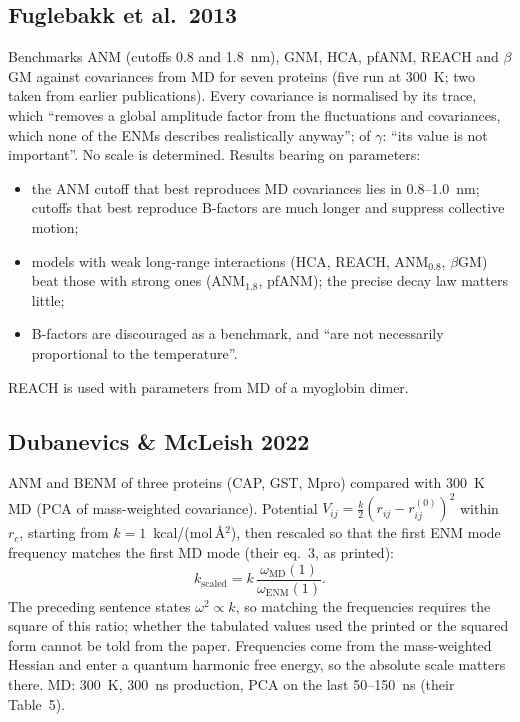 \documentclass[11pt]{article}
\begin{document}
\subsection*{Fuglebakk et al.\ 2013 \cite{fuglebakk2013}}

Benchmarks ANM (cutoffs 0.8 and 1.8~nm), GNM, HCA, pfANM, REACH and $\beta$GM against
covariances from MD for seven proteins (five run at 300~K; two taken from earlier
publications).
Every covariance is normalised by its trace, which ``removes a global amplitude factor from
the fluctuations and covariances, which none of the ENMs describes realistically anyway'';
of $\gamma$: ``its value is not important''.
No scale is determined.
Results bearing on parameters:
\begin{itemize}
\item the ANM cutoff that best reproduces MD covariances lies in 0.8--1.0~nm; cutoffs that
best reproduce B-factors are much longer and suppress collective motion;
\item models with weak long-range interactions (HCA, REACH, ANM$_{0.8}$, $\beta$GM) beat
those with strong ones (ANM$_{1.8}$, pfANM); the precise decay law matters little;
\item B-factors are discouraged as a benchmark, and ``are not necessarily proportional to the
temperature''.
\end{itemize}
REACH is used with parameters from MD of a myoglobin dimer.

\subsection*{Dubanevics \& McLeish 2022 \cite{dubanevics2022}}

ANM and BENM of three proteins (CAP, GST, Mpro) compared with 300~K MD (PCA of
mass-weighted covariance).
Potential $V_{ij} = \tfrac{k}{2}(r_{ij}-r^{(0)}_{ij})^2$ within $r_c$, starting from
$k = 1$~kcal/(mol\,\AA$^2$), then rescaled so that the first ENM mode frequency matches
the first MD mode (their eq.~3, as printed):
\begin{equation*}
k_{\mathrm{scaled}} = k\,\frac{\omega_{\mathrm{MD}}(1)}{\omega_{\mathrm{ENM}}(1)} .
\end{equation*}
The preceding sentence states $\omega^2 \propto k$, so matching the frequencies requires the
square of this ratio; whether the tabulated values used the printed or the squared form
cannot be told from the paper.
Frequencies come from the mass-weighted Hessian and enter a quantum harmonic free energy,
so the absolute scale matters there.
MD: 300~K, 300~ns production, PCA on the last 50--150~ns (their Table~5).
\end{document}
